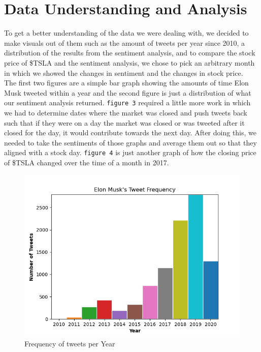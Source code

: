 \documentclass[12pt, notitlepage]{article}
\begin{document}
\section{Data Understanding and Analysis}
To get a better understanding of the data we were dealing with, we decided to make visuals out of them such as the amount of tweets per year since 2010, a distribution of the results from the sentiment analysis, and to compare the stock price of \$TSLA and the sentiment analysis, we chose to pick an arbitrary month in which we showed the changes in sentiment and the changes in stock price.\\
The first two figures are a simple bar graph showing the amounts of time Elon Musk tweeted within a year and the second figure is just a distribution of what our sentiment analysis returned. \texttt{figure 3} required a little more work in which we had to determine dates where the market was closed and push tweets back such that if they were on a day the market was closed or was tweeted after it closed for the day, it would contribute towards the next day. After doing this, we needed to take the sentiments of those graphs and average them out so that they aligned with a stock day. \texttt{figure 4} is just another graph of how the closing price of \$TSLA changed over the time of a month in 2017.
\begin{figure}[h!]
	\centering
	\includegraphics[scale=0.8]{images/Frequency.png}
	\caption{Frequency of tweets per Year}
	\label{fig:F}
\end{figure}
\end{document}
